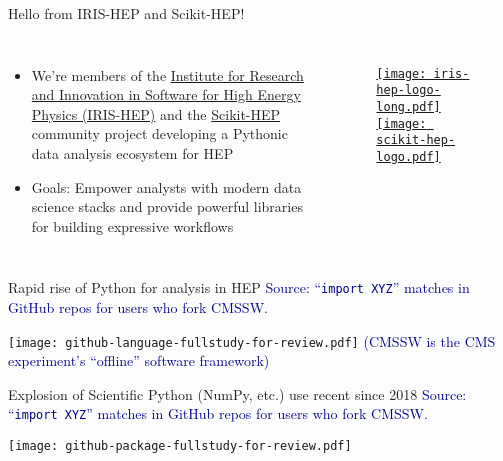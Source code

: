 \begin{frame}{Hello from IRIS-HEP and Scikit-HEP!}
  \begin{columns}
    \Large
    \begin{itemize}\setlength{\itemsep}{0.5 cm}
      \item We're members of the \href{https://iris-hep.org/}{Institute for Research and Innovation in Software for High Energy Physics (IRIS-HEP)} and the \href{https://scikit-hep.org/}{Scikit-HEP} community project developing a Pythonic data analysis ecosystem for HEP
      \item Goals: Empower analysts with modern data science stacks and provide powerful libraries for building expressive workflows
    \end{itemize}
%
    \begin{figure}
        \begin{center}
            \href{https://iris-hep.org/}{\texttt{[image: iris-hep-logo-long.pdf]}}
            \href{https://scikit-hep.org/}{\texttt{[image: scikit-hep-logo.pdf]}}
        \end{center}
    \end{figure}
  \end{columns}
\end{frame}

\begin{frame}{Rapid rise of Python for analysis in HEP}
\vspace{0.25 cm}
\textcolor{darkblue}{Source: ``\texttt{import XYZ}'' matches in GitHub repos for users who fork CMSSW.}

\vspace{0.2 cm}
\texttt{[image: github-language-fullstudy-for-review.pdf]}
\textcolor{darkblue}{\tiny (CMSSW is the CMS experiment's ``offline'' software framework)}
\end{frame}

\begin{frame}{Explosion of Scientific Python (NumPy, etc.) use recent since 2018}
\vspace{0.25 cm}
\textcolor{darkblue}{Source: ``\texttt{import XYZ}'' matches in GitHub repos for users who fork CMSSW.}

\vspace{0.2 cm}
\texttt{[image: github-package-fullstudy-for-review.pdf]}
\end{frame}

